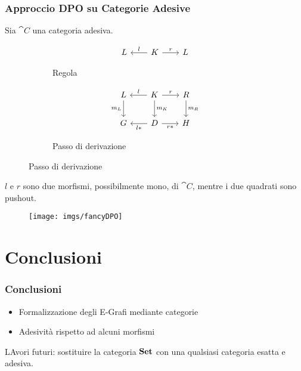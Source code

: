 \documentclass[8pt]{beamer}
\begin{document}
\begin{frame}[fragile]\frametitle{Approccio DPO su Categorie Adesive}
	Sia $\cat C$ una categoria adesiva.
	\begin{figure}[h]
		\begin{subfigure}{0.25\textwidth}
			\[\begin{tikzcd}[row sep = 20, column sep = 20] L & K \arrow[r, "r"] \arrow[l, "l"swap] & L \end{tikzcd}\]
		\label{fig:rule}
		\caption{Regola}
		\end{subfigure}
		\qquad
		\begin{subfigure}{0.25\textwidth}
			\[\begin{tikzcd}[row sep = 20, column sep = 20]
			L \arrow[d, "{m_L}"swap] & K\arrow[d, "{m_K}"] \arrow[r, "r"] \arrow[l, "l"swap] & R \arrow[d, "{m_R}"] \\
				G & D \arrow[l, "{l*}"] \arrow[r, "{r*}"swap] & H
		\end{tikzcd}\]
		\caption{Passo di derivazione}
		\label{fig:step}
		\end{subfigure}
	\end{figure}
	$l$ e $r$ sono due morfismi, possibilmente mono, di $\cat C$, 
	mentre i due quadrati sono pushout.


	\begin{figure}
		\texttt{[image: imgs/fancyDPO]}
	\end{figure}
\end{frame}

\section{Conclusioni}
\begin{frame}\frametitle{Conclusioni}
	\begin{itemize}
		\item Formalizzazione degli E-Grafi mediante categorie
		\item Adesività rispetto ad alcuni morfismi
	\end{itemize}

	LAvori futuri: sostituire la categoria $\mathbf{Set}$ con una qualsiasi categoria esatta e adesiva.
\end{frame}
\end{document}
